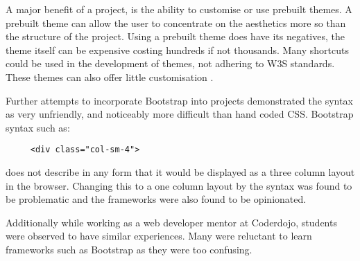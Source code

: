 \newpage

A major benefit of a project, is the ability to customise or use prebuilt themes. A prebuilt theme can allow the user to concentrate on the aesthetics more so than the structure of the project. Using a prebuilt theme does have its negatives, the theme itself can be expensive costing hundreds if not thousands. Many shortcuts could be used in the development of themes, not adhering to W3S standards. These themes can also offer little customisation \citep{NATH16}.

Further attempts to incorporate Bootstrap into projects demonstrated the syntax as very unfriendly, and noticeably more difficult than hand coded CSS. Bootstrap syntax such as: \begin{lstlisting}
	 <div class="col-sm-4">\end{lstlisting} 
	 does not describe in any form that it would be displayed as a three column layout in the browser. Changing this to a one column layout by the syntax was found to be problematic and the frameworks were also found to be opinionated.  
	 
Additionally while working as a web developer mentor at Coderdojo, students were observed to have similar experiences. Many were reluctant to learn frameworks such as Bootstrap as they were too confusing.

%